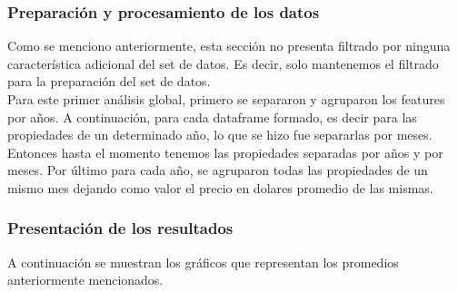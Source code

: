 \documentclass[a4paper, 10pt]{article}
\begin{document}
        \subsubsection{Preparación y procesamiento de los datos}

        Como se menciono anteriormente, esta sección no presenta filtrado por ninguna característica adicional del set de datos. Es decir, solo mantenemos el filtrado para la preparación del set de datos.\\
        Para este primer análisis global, primero se separaron y agruparon los features por años. A continuación, para cada dataframe formado, es decir para las propiedades de un determinado año, lo que se hizo fue separarlas por meses. Entonces hasta el momento tenemos las propiedades separadas por años y por meses. Por último para cada año, se agruparon todas las propiedades de un mismo mes dejando como valor el precio en dolares promedio de las mismas.

        \subsubsection{Presentación de los resultados}

        A continuación se muestran los gráficos que representan los promedios anteriormente mencionados.
\end{document}
